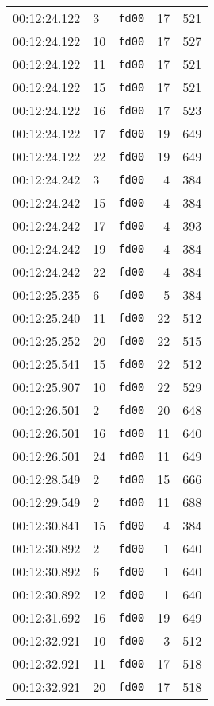 \documentclass{article}
\begin{document}
\begin{longtable}{lllrr}
00:12:24.122 & 3 & \texttt{fd00} & 17 & 521 \\
00:12:24.122 & 10 & \texttt{fd00} & 17 & 527 \\
00:12:24.122 & 11 & \texttt{fd00} & 17 & 521 \\
00:12:24.122 & 15 & \texttt{fd00} & 17 & 521 \\
00:12:24.122 & 16 & \texttt{fd00} & 17 & 523 \\
00:12:24.122 & 17 & \texttt{fd00} & 19 & 649 \\
00:12:24.122 & 22 & \texttt{fd00} & 19 & 649 \\
00:12:24.242 & 3 & \texttt{fd00} & 4 & 384 \\
00:12:24.242 & 15 & \texttt{fd00} & 4 & 384 \\
00:12:24.242 & 17 & \texttt{fd00} & 4 & 393 \\
00:12:24.242 & 19 & \texttt{fd00} & 4 & 384 \\
00:12:24.242 & 22 & \texttt{fd00} & 4 & 384 \\
00:12:25.235 & 6 & \texttt{fd00} & 5 & 384 \\
00:12:25.240 & 11 & \texttt{fd00} & 22 & 512 \\
00:12:25.252 & 20 & \texttt{fd00} & 22 & 515 \\
00:12:25.541 & 15 & \texttt{fd00} & 22 & 512 \\
00:12:25.907 & 10 & \texttt{fd00} & 22 & 529 \\
00:12:26.501 & 2 & \texttt{fd00} & 20 & 648 \\
00:12:26.501 & 16 & \texttt{fd00} & 11 & 640 \\
00:12:26.501 & 24 & \texttt{fd00} & 11 & 649 \\
00:12:28.549 & 2 & \texttt{fd00} & 15 & 666 \\
00:12:29.549 & 2 & \texttt{fd00} & 11 & 688 \\
00:12:30.841 & 15 & \texttt{fd00} & 4 & 384 \\
00:12:30.892 & 2 & \texttt{fd00} & 1 & 640 \\
00:12:30.892 & 6 & \texttt{fd00} & 1 & 640 \\
00:12:30.892 & 12 & \texttt{fd00} & 1 & 640 \\
00:12:31.692 & 16 & \texttt{fd00} & 19 & 649 \\
00:12:32.921 & 10 & \texttt{fd00} & 3 & 512 \\
00:12:32.921 & 11 & \texttt{fd00} & 17 & 518 \\
00:12:32.921 & 20 & \texttt{fd00} & 17 & 518 \\

\end{longtable}
\end{document}
